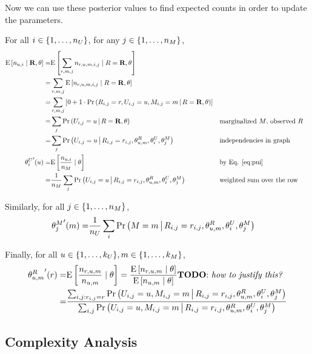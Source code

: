 \documentclass{article}
\begin{document}
Now we can use these posterior values to find expected counts in order
to update the parameters.

For all $i \in {\left\{ 1, \dots, n_U \right\}}$, for any $j \in {\left\{ 1, \dots, n_M \right\}}$,
\begin{align}
  {\textrm{E} \left[ n_{u,i} \mid {\bf R}, \theta \right]}
  =& {\textrm{E} \left[  \sum_{r,m,j} n_{r,u,m,i,j}  \mid R = {\bf R}, \theta \right]} \\
  =& \sum_{r,m,j} {\textrm{E} \left[  n_{r,u,m,i,j}  \mid R = {\bf R}, \theta \right]} \\
  =& \sum_{r,m,j} \left[
    0 + 1 \cdot {{\Pr \left(   R_{i,j} = r, U_{i,j} = u, M_{i,j} = m  \,\middle|\, R = {\bf R}, \theta  \right)}}
  \right] \\
  =& \sum_j {{\Pr \left(  U_{i,j} = u \,\middle|\, R = {\bf R}, \theta  \right)}}
  && \text{marginalized $M$, observed $R$} \\
  =& \sum_j {{\Pr \left(  U_{i,j} = u \,\middle|\, R_{i,j} = r_{i,j}, \theta^R_{u,m},
    \theta^U_i, \theta^M_j  \right)}}
  && \text{independencies in graph} \\
  {\theta^U_i}'(u)
  =& {\textrm{E} \left[  \frac{ n_{u,i}}{ n_M }  \mid \theta \right]} && \text{by Eq. \ref{eq:pui}} \\
  =& \frac{1}{n_M} \sum_j {{\Pr \left(  U_{i,j} = u \,\middle|\,  R_{i,j} = r_{i,j}, \theta^R_{u,m},
    \theta^U_i, \theta^M_j   \right)}}
  && \text{weighted sum over the row}
\end{align}

Similarly, for all $j \in {\left\{ 1, \dots, n_M \right\}}$,
\begin{align}
  {\theta^M_j}'(m) =&
  \frac{1}{n_U} \sum_i {{\Pr \left(  M = m \,\middle|\, 
    R_{i,j} = r_{i,j}, \theta^R_{u,m}, \theta^U_i, \theta^M_j  \right)}}
\end{align}

Finally, for all $u \in {\left\{ 1, \dots, k_U \right\}}, m \in {\left\{ 1, \dots, k_M \right\}}$,
\begin{align}
  {\theta^R_{u,m}}'(r)
  =& {\textrm{E} \left[  \frac{n_{r,u,m}}{n_{u,m}}  \mid \theta \right]}
  = \frac{ {\textrm{E} \left[ n_{r,u,m}  \mid \theta \right]} }{ {\textrm{E} \left[ n_{u,m} \mid \theta \right]} }
   \text{{\textbf{TODO}: \textit{how to justify this?}}} \\
  =& \frac{\sum_{i,j: r_{i,j} = r} {{\Pr \left(  U_{i,j} = u, M_{i,j} = m \,\middle|\, 
      R_{i,j} = r_{i,j}, \theta^R_{u,m}, \theta^U_i, \theta^M_j  \right)}}
  }{ \sum_{i,j} {{\Pr \left(  U_{i,j} = u, M_{i,j} = m \,\middle|\, 
      R_{i,j} = r_{i,j}, \theta^R_{u,m}, \theta^U_i, \theta^M_j  \right)}} } \\
\end{align}

\subsection{Complexity Analysis}
\end{document}
